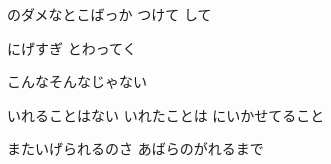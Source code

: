 \documentclass[a4paper,tate,twocolumn,12pt]{ltjtarticle}
\begin{document}
\begin{flushleft}
\vspace{2em}

\noindent\begin{minipage}{\linewidth}
のダメなとこばっか つけて して

にげすぎ とわってく

こんなそんなじゃない

いれることはない いれたことは にいかせてること

またいげられるのさ あばらのがれるまで
\end{minipage}

\end{flushleft}
\end{document}
